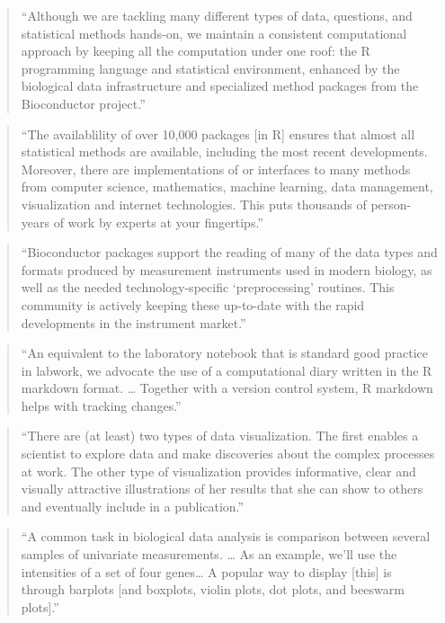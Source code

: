 \documentclass[]{tufte-book}
\begin{document}
\begin{quote}
``Although we are tackling many different types of data, questions, and
statistical methods hands-on, we maintain a consistent computational approach
by keeping all the computation under one roof: the R programming language and
statistical environment, enhanced by the biological data infrastructure and
specialized method packages from the Bioconductor project.'' \citep{holmes2018modern}
\end{quote}

\begin{quote}
``The availablility of over 10,000 packages {[}in R{]} ensures that almost all
statistical methods are available, including the most recent developments.
Moreover, there are implementations of or interfaces to many methods from
computer science, mathematics, machine learning, data management, visualization
and internet technologies. This puts thousands of person-years of work by
experts at your fingertips.'' \citep{holmes2018modern}
\end{quote}

\begin{quote}
``Bioconductor packages support the reading of many of the data types and formats
produced by measurement instruments used in modern biology, as well as the
needed technology-specific `preprocessing' routines. This community is
actively keeping these up-to-date with the rapid developments in the
instrument market.'' \citep{holmes2018modern}
\end{quote}

\begin{quote}
``An equivalent to the laboratory notebook that is standard good practice in
labwork, we advocate the use of a computational diary written in the R markdown
format. \ldots{} Together with a version control system, R markdown helps with
tracking changes.'' \citep{holmes2018modern}
\end{quote}

\begin{quote}
``There are (at least) two types of data visualization. The first enables
a scientist to explore data and make discoveries about the complex processes
at work. The other type of visualization provides informative, clear and
visually attractive illustrations of her results that she can show to others
and eventually include in a publication.'' \citep{holmes2018modern}
\end{quote}

\begin{quote}
``A common task in biological data analysis is comparison between several
samples of univariate measurements. \ldots{} As an example, we'll use the intensities
of a set of four genes\ldots{} A popular way to display {[}this{]} is through
barplots {[}and boxplots, violin plots, dot plots, and beeswarm plots{]}.'' \citep{holmes2018modern}
\end{quote}
\end{document}
